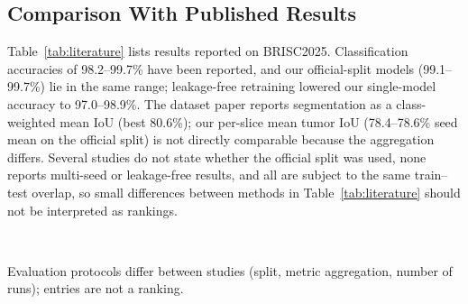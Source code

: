 \documentclass[journal]{IEEEtran}
\begin{document}
\subsection{Comparison With Published Results}
Table~\ref{tab:literature} lists results reported on BRISC2025. Classification accuracies of 98.2--99.7\% have been reported, and our official-split models (99.1--99.7\%) lie in the same range; leakage-free retraining lowered our single-model accuracy to 97.0--98.9\%. The dataset paper reports segmentation as a class-weighted mean IoU (best 80.6\%); our per-slice mean tumor IoU (78.4--78.6\% seed mean on the official split) is not directly comparable because the aggregation differs. Several studies do not state whether the official split was used, none reports multi-seed or leakage-free results, and all are subject to the same train--test overlap, so small differences between methods in Table~\ref{tab:literature} should not be interpreted as rankings.

\begin{table}[!t]
\caption{Published Results on BRISC2025 (as Reported by the Authors)}
\label{tab:literature}
\centering
\footnotesize
\setlength{\tabcolsep}{3pt}
\\[2pt]
\parbox{\columnwidth}{\footnotesize Evaluation protocols differ between studies (split, metric aggregation, number of runs); entries are not a ranking.}
\end{table}
\end{document}
